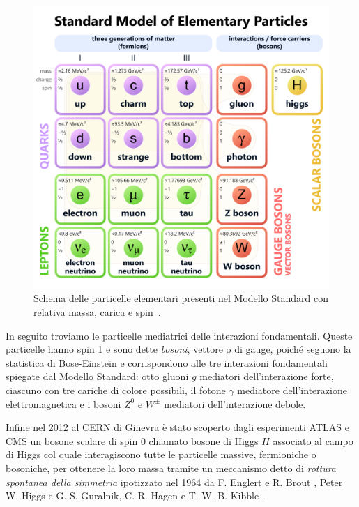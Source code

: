     \begin{figure}[t]
        \centering
        \includegraphics[width=0.8\linewidth]{res/fig/1-chapter/1-Standard_Model_of_Elementary_Particles.pdf}
        \caption{Schema delle particelle elementari presenti nel Modello Standard con relativa massa, carica e spin~\cite{Wikimedia_Standard_Model}.}
        \label{fig:1-standard-model}
    \end{figure}

    In seguito troviamo le particelle mediatrici delle interazioni fondamentali. Queste particelle hanno spin 1 e sono dette \textit{bosoni}, vettore o di gauge, poiché seguono la statistica di Bose-Einstein e corrispondono alle tre interazioni fondamentali spiegate dal Modello Standard: otto gluoni $g$ mediatori dell'interazione forte, ciascuno con tre cariche di colore possibili, il fotone $\gamma$ mediatore dell'interazione elettromagnetica e i bosoni $Z^0$ e $W^\pm$ mediatori dell'interazione debole.

    Infine nel 2012 al CERN di Ginevra è stato scoperto dagli esperimenti ATLAS \cite{ATLAS_2012} e CMS \cite{CMS_2012} un bosone scalare di spin 0 chiamato bosone di Higgs $H$ associato al campo di Higgs col quale interagiscono tutte le particelle massive, fermioniche o bosoniche, per ottenere la loro massa tramite un meccanismo detto di \textit{rottura spontanea della simmetria} ipotizzato nel 1964 da F. Englert e R. Brout \cite{Englert_1964}, Peter W. Higgs \cite{Higgs_1964} e G. S. Guralnik, C. R. Hagen e T. W. B. Kibble \cite{GHK_1964}.
    
